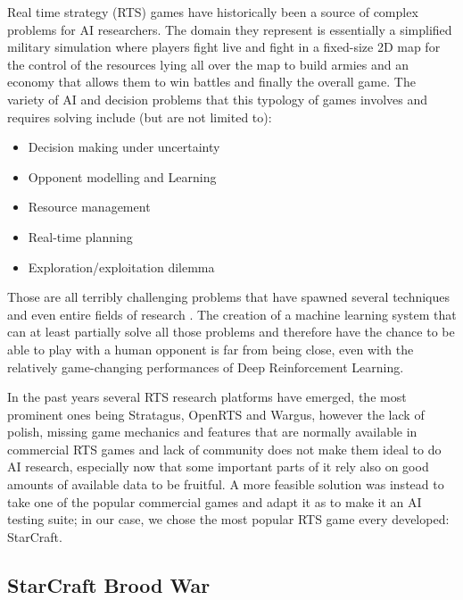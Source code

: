 Real time strategy (RTS) games have historically been a source of complex
problems for AI researchers. The domain they represent is essentially a
simplified military simulation where players fight live and fight in a
fixed-size 2D map for the control of the resources lying all over the map to
build armies and an economy that allows them to win battles and finally the
overall game. The variety of AI and decision problems that this typology of
games involves and requires solving include (but are not limited to):

\begin{itemize}
  \item Decision making under uncertainty
  \item Opponent modelling and Learning
  \item Resource management
  \item Real-time planning
  \item Exploration/exploitation dilemma
\end{itemize}

Those are all terribly challenging problems that have spawned several techniques
and even entire fields of research \citep{buro2003real}. The creation of a machine
learning system that can at least partially solve all those problems and
therefore have the chance to be able to play with a human opponent is far from
being close, even with the relatively game-changing performances of Deep
Reinforcement Learning.

In the past years several RTS research platforms have emerged, the most
prominent ones being Stratagus, OpenRTS and Wargus, however the lack of polish,
missing game mechanics and features that are normally available in commercial
RTS games and lack of community does not make them ideal to do AI research,
especially now that some important parts of it rely also on good amounts of
available data to be fruitful. A more feasible solution was instead to take one
of the popular commercial games and adapt it as to make it an AI testing suite;
in our case, we chose the most popular RTS game every developed: StarCraft.

\subsection{StarCraft Brood War}

